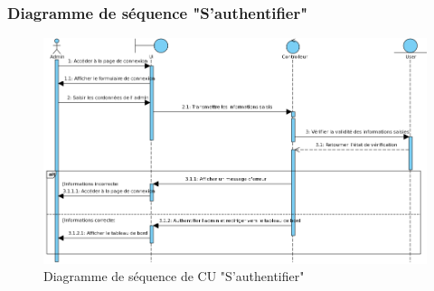 \subsubsection{Diagramme de séquence "S'authentifier"}
\begin{figure}[H]
	\centering
	\includegraphics[width=1\textwidth]{logos/sauthentifier.png}
	\caption{Diagramme de séquence de CU "S'authentifier"}
	\label{fig:sauthentifier}
\end{figure}

